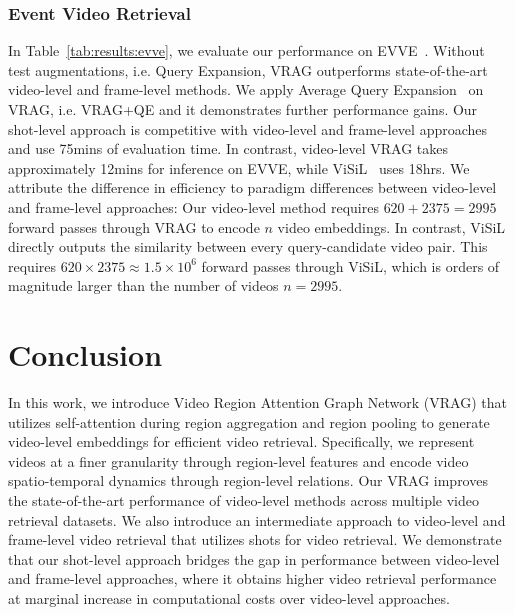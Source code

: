 \documentclass[letterpaper]{article} \usepackage{aaai22}  \usepackage{times}  \usepackage{helvet}  \usepackage{courier}  \usepackage[hyphens]{url}  \usepackage{graphicx} \urlstyle{rm} \usepackage{amsmath}
\begin{document}
\subsubsection{Event Video Retrieval}
In Table~\ref{tab:results:evve}, we evaluate our performance on EVVE~\cite{dataset:evve}. Without test augmentations, i.e. Query Expansion, VRAG outperforms state-of-the-art video-level and frame-level methods. We apply Average Query Expansion~\cite{query-expansion} on VRAG, i.e. VRAG+QE and it demonstrates further performance gains. Our shot-level approach is competitive with video-level and frame-level approaches and use 75mins of evaluation time. In contrast, video-level VRAG takes approximately 12mins for inference on EVVE, while ViSiL~\cite{kordopatiszilos2019visil} uses 18hrs. 
We attribute the difference in efficiency to paradigm differences between video-level and frame-level approaches: Our video-level method requires $620 + 2375 = 2995$ forward passes through VRAG to encode $n$ video embeddings. In contrast, ViSiL directly outputs the similarity between every query-candidate video pair. This requires $620 \times 2375 \approx 1.5\times10^6$ forward passes through ViSiL, which is orders of magnitude larger than the number of videos $n=2995$. 





\section{Conclusion}

In this work, we introduce Video Region Attention Graph Network (VRAG) that utilizes self-attention during region aggregation and region pooling to generate video-level embeddings for efficient video retrieval. 
Specifically, we represent videos at a finer granularity through region-level features and encode video spatio-temporal dynamics through region-level relations. 
Our VRAG improves the state-of-the-art performance of video-level methods across multiple video retrieval datasets. We also introduce an intermediate approach to video-level and frame-level video retrieval that utilizes shots for video retrieval. We demonstrate that our shot-level approach bridges the gap in performance between video-level and frame-level approaches, where it obtains higher video retrieval performance at marginal increase in computational costs over video-level approaches.



\clearpage
\end{document}
